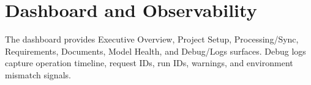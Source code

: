 \section{Dashboard and Observability}
The dashboard provides Executive Overview, Project Setup, Processing/Sync, Requirements, Documents, Model Health, and Debug/Logs surfaces. Debug logs capture operation timeline, request IDs, run IDs, warnings, and environment mismatch signals.

